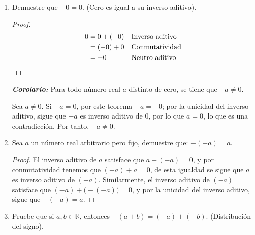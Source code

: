 \documentclass[11pt]{article}
\newcommand{\R}{\mathbb{R}}
\newcommand{\bfit}[1]{\textbf{\textit{#1}}}
\begin{document}
\begin{enumerate}[label=\alph*)]
    \item Demuestre que $-0 = 0$. (Cero es igual a su inverso aditivo).
    \vspace{-1em}\begin{proof}
        \begin{align*}
            0 &= 0 + (-0) && \text{Inverso aditivo}\\
            &= (-0) + 0 && \text{Conmutatividad}\\
            &= -0 && \text{Neutro aditivo} \qedhere
        \end{align*}
    \end{proof} \vspace{-1em}
%
    \bfit{Corolario:} Para todo número real $a$ distinto de cero, se tiene que $-a\neq 0$.

    Sea $a\neq 0$. Si $-a=0$, por este teorema $-a=-0$; por la unicidad del inverso aditivo, sigue que $-a$ es inverso aditivo de $0$, por lo que $a=0$, lo que es una contradicción. Por tanto, $-a\neq 0$.

    \item Sea $a$ un número real arbitrario pero fijo, demuestre que: $-(-a)=a$.
        
    \vspace{-1em}\begin{proof} 
        El inverso aditivo de $a$ satisface que $a + (-a) = 0$, y por conmutatividad tenemos que $(-a) + a = 0$, de esta igualdad se sigue que $a$ es inverso aditivo de $(-a)$. Similarmente, el inverso aditivo de $(-a)$ satisface que $(-a) + \bigl(-(-a)\bigr) = 0$, y por la unicidad del inverso aditivo, sigue que $-(-a) = a$. \qedhere    
    \end{proof} \vspace{-1em}

    \item Pruebe que si $a,b\in \R$, entonces $-(a+b)=(-a)+(-b)$. (Distribución del signo).


\end{enumerate}
\end{document}
